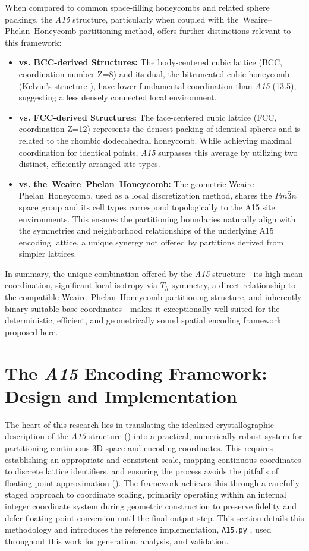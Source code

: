 \documentclass[10pt]{article}
\def\AAAB{\textit{A15}}
\def\WP{Weaire--Phelan}
\def\WPH{\WP{}~Honeycomb}
\def\tWPH{the~\WP{}~Honeycomb}
\begin{document}
When compared to common space-filling honeycombs and related sphere packings, the \AAAB{} structure, particularly when coupled with \tWPH{} partitioning method, offers further distinctions relevant to this framework:
\begin{itemize} \itemsep0pt
    \item \textbf{vs. BCC-derived Structures:} The body-centered cubic lattice (BCC, coordination number Z=8) and its dual, the bitruncated cubic honeycomb (Kelvin's structure \cite{Kelvin1887}), have lower fundamental coordination than \AAAB{} (13.5), suggesting a less densely connected local environment.
    \item \textbf{vs. FCC-derived Structures:} The face-centered cubic lattice (FCC, coordination Z=12) represents the densest packing of identical spheres \cite{ConwaySloane1999} and is related to the rhombic dodecahedral honeycomb. While achieving maximal coordination for identical points, \AAAB{} surpasses this average by utilizing two distinct, efficiently arranged site types.
    \item \textbf{vs. \tWPH{}:} The geometric \WPH{}, used as a local discretization method, shares the $Pm\bar{3}n$ space group and its cell types correspond topologically to the A15 site environments. This ensures the partitioning boundaries naturally align with the symmetries and neighborhood relationships of the underlying A15 encoding lattice, a unique synergy not offered by partitions derived from simpler lattices.
\end{itemize}
In summary, the unique combination offered by the \AAAB{} structure—its high mean coordination, significant local isotropy via $T_h$ symmetry, a direct relationship to the compatible \WPH{} partitioning structure, and inherently binary-suitable base coordinates—makes it exceptionally well-suited for the deterministic, efficient, and geometrically sound spatial encoding framework proposed here.

\section{The \AAAB{} Encoding Framework: Design and Implementation}\label{sec-framework-design}

The heart of this research lies in translating the idealized crystallographic description of the \AAAB{} structure () into a practical, numerically robust system for partitioning continuous 3D space and encoding coordinates. This requires establishing an appropriate and consistent scale, mapping continuous coordinates to discrete lattice identifiers, and ensuring the process avoids the pitfalls of floating-point approximation (). The framework achieves this through a carefully staged approach to coordinate scaling, primarily operating within an internal integer coordinate system during geometric construction to preserve fidelity and defer floating-point conversion until the final output step. This section details this methodology and introduces the reference implementation, \texttt{A15.py} \cite{Risinger2024A15}, used throughout this work for generation, analysis, and validation.
\end{document}
